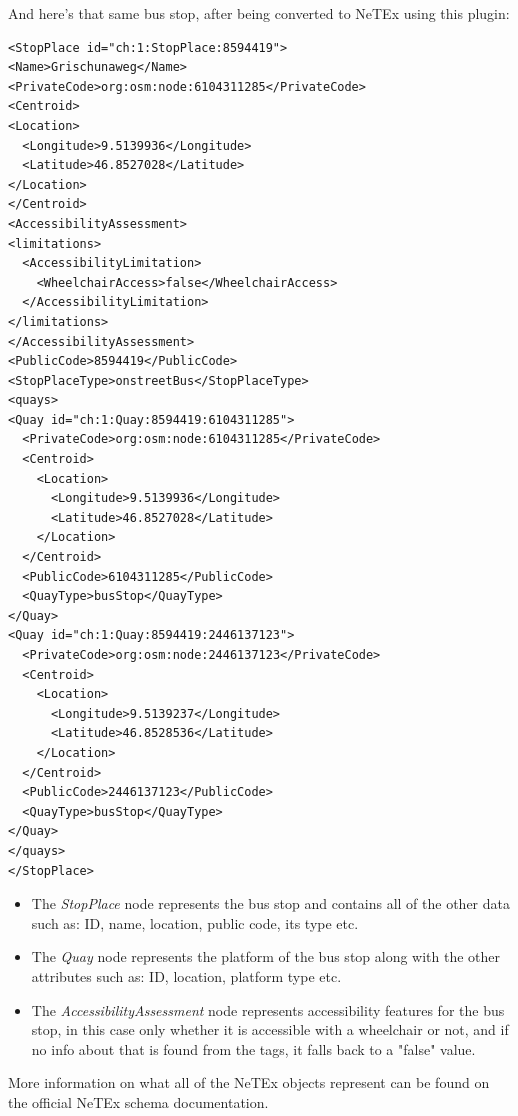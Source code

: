 And here's that same bus stop, after being converted to NeTEx using this plugin:
\begin{verbatim}
<StopPlace id="ch:1:StopPlace:8594419">
<Name>Grischunaweg</Name>
<PrivateCode>org:osm:node:6104311285</PrivateCode>
<Centroid>
<Location>
  <Longitude>9.5139936</Longitude>
  <Latitude>46.8527028</Latitude>
</Location>
</Centroid>
<AccessibilityAssessment>
<limitations>
  <AccessibilityLimitation>
    <WheelchairAccess>false</WheelchairAccess>
  </AccessibilityLimitation>
</limitations>
</AccessibilityAssessment>
<PublicCode>8594419</PublicCode>
<StopPlaceType>onstreetBus</StopPlaceType>
<quays>
<Quay id="ch:1:Quay:8594419:6104311285">
  <PrivateCode>org:osm:node:6104311285</PrivateCode>
  <Centroid>
    <Location>
      <Longitude>9.5139936</Longitude>
      <Latitude>46.8527028</Latitude>
    </Location>
  </Centroid>
  <PublicCode>6104311285</PublicCode>
  <QuayType>busStop</QuayType>
</Quay>
<Quay id="ch:1:Quay:8594419:2446137123">
  <PrivateCode>org:osm:node:2446137123</PrivateCode>
  <Centroid>
    <Location>
      <Longitude>9.5139237</Longitude>
      <Latitude>46.8528536</Latitude>
    </Location>
  </Centroid>
  <PublicCode>2446137123</PublicCode>
  <QuayType>busStop</QuayType>
</Quay>
</quays>
</StopPlace>
\end{verbatim}
\begin{itemize}
\item{The \textit{StopPlace} node represents the bus stop and contains all of the other data such as: ID, name, location, public code, its type etc.}
\item{The \textit{Quay} node represents the platform of the bus stop along with the other attributes such as: ID, location, platform type etc.}
\item{The \textit{AccessibilityAssessment} node represents accessibility features for the bus stop, in this case only whether it is accessible with a wheelchair or not, and if no info about that is found from the tags, it falls back to a "false" value.}
\end{itemize}
More information on what all of the NeTEx objects represent can be found on the official NeTEx schema documentation.
\newpage
